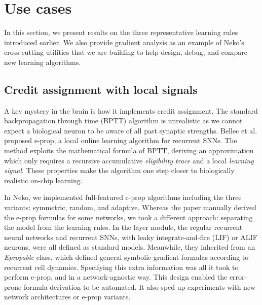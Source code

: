 \documentclass[sigconf,dvipsnames]{acmart}
\begin{document}
\section{Use cases}
In this section, we present results on the three representative learning rules introduced earlier.
We also provide gradient analysis as an example of Neko's cross-cutting utilities that we are building to help design, debug, and compare new learning algorithms.

\subsection{Credit assignment with local signals}
A key mystery in the brain is how it implements credit assignment.
The standard backpropagation through time (BPTT) algorithm is unrealistic as we cannot expect a biological neuron to be aware of all past synaptic strengths.
Bellec et al. \cite{bellec2020solution} proposed e-prop, a local online learning algorithm for recurrent SNNs.
The method exploits the mathematical formula of BPTT, deriving an approximation which only requires a recursive accumulative \emph{eligibility trace} and a local \emph{learning signal}.
These properties make the algorithm one step closer to biologically realistic on-chip learning.

In Neko, we implemented full-featured e-prop algorithms including the three variants: symmetric, random, and adaptive.
Whereas the paper manually derived the e-prop formulas for some networks, we took a different approach: separating the model from the learning rules.
In the layer module, the regular recurrent neural networks and recurrent SNNs, with leaky integrate-and-fire (LIF) or ALIF neurons, were all defined as standard models.
Meanwhile, they inherited from an \emph{Epropable} class, which defined general symbolic gradient formulas according to recurrent cell dynamics.
Specifying this extra information was all it took to perform e-prop, and in a network-agnostic way.
This design enabled the error-prone formula derivation to be automated.
It also sped up experiments with new network architectures or e-prop variants.
\end{document}

